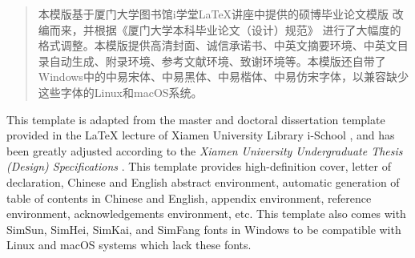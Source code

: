 \documentclass{xmu}
\begin{document}

\begin{abstract}
    本模版基于厦门大学图书馆i学堂LaTeX讲座中提供的硕博毕业论文模版 \parencite{xmuischool} 改编而来，并根据《厦门大学本科毕业论文（设计）规范》\parencite{xmuthesis} 进行了大幅度的格式调整。本模版提供高清封面、诚信承诺书、中英文摘要环境、中英文目录自动生成、附录环境、参考文献环境、致谢环境等。本模版还自带了Windows中的中易宋体、中易黑体、中易楷体、中易仿宋字体，以兼容缺少这些字体的Linux和macOS系统。
\end{abstract}

\begin{enabstract}
    This template is adapted from the master and doctoral dissertation template provided in the LaTeX lecture of Xiamen University Library i-School \parencite{xmuischool}, and has been greatly adjusted according to the \textit{Xiamen University Undergraduate Thesis (Design) Specifications} \parencite{xmuthesis}. This template provides high-definition cover, letter of declaration, Chinese and English abstract environment, automatic generation of table of contents in Chinese and English, appendix environment, reference environment, acknowledgements environment, etc. This template also comes with SimSun, SimHei, SimKai, and SimFang fonts in Windows to be compatible with Linux and macOS systems which lack these fonts.
\end{enabstract}

\tableofcontents

\end{document}
